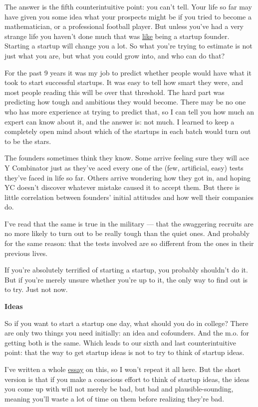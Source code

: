 \documentclass[12pt]{book}
\begin{document}
The answer is the fifth counterintuitive point: you can't tell. Your
life so far may have given you some idea what your prospects might be if
you tried to become a mathematician, or a professional football player.
But unless you've had a very strange life you haven't done much that was
\href{really.html}{like} being a startup founder. Starting a startup
will change you a lot. So what you're trying to estimate is not just
what you are, but what you could grow into, and who can do that?

For the past 9 years it was my job to predict whether people would have
what it took to start successful startups. It was easy to tell how smart
they were, and most people reading this will be over that threshold. The
hard part was predicting how tough and ambitious they would become.
There may be no one who has more experience at trying to predict that,
so I can tell you how much an expert can know about it, and the answer
is: not much. I learned to keep a completely open mind about which of
the startups in each batch would turn out to be the stars.

The founders sometimes think they know. Some arrive feeling sure they
will ace Y Combinator just as they've aced every one of the (few,
artificial, easy) tests they've faced in life so far. Others arrive
wondering how they got in, and hoping YC doesn't discover whatever
mistake caused it to accept them. But there is little correlation
between founders' initial attitudes and how well their companies do.

I've read that the same is true in the military --- that the swaggering
recruits are no more likely to turn out to be really tough than the
quiet ones. And probably for the same reason: that the tests involved
are so different from the ones in their previous lives.

If you're absolutely terrified of starting a startup, you probably
shouldn't do it. But if you're merely unsure whether you're up to it,
the only way to find out is to try. Just not now.

\textbf{Ideas}

So if you want to start a startup one day, what should you do in
college? There are only two things you need initially: an idea and
cofounders. And the m.o. for getting both is the same. Which leads to
our sixth and last counterintuitive point: that the way to get startup
ideas is not to try to think of startup ideas.

I've written a whole \href{startupideas.html}{essay} on this, so I won't
repeat it all here. But the short version is that if you make a
conscious effort to think of startup ideas, the ideas you come up with
will not merely be bad, but bad and plausible-sounding, meaning you'll
waste a lot of time on them before realizing they're bad.
\end{document}
